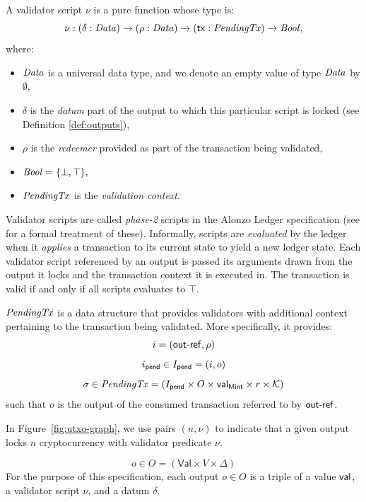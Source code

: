 \begin{definition}
A validator script $\nu$ is a pure function whose type is:
\[
  \nu : (\delta : \mathit{Data}) \to (\rho : \mathit{Data}) \to (\mathsf{tx} : \mathit{PendingTx})
  \to\mathit{Bool},
\]
where: 
\begin{itemize}
    \item $\mathit{Data}$ is a universal data type, and we denote an empty value of type $\mathit{Data}$ by $\emptyset$,  
    \item $\delta$ is the \emph{datum} part of the output to which this particular script is locked (see Definition \ref{def:outputs}),
    \item $\rho$ is the \emph{redeemer} provided as part of the transaction being validated,
    \item $\mathit{Bool} = \{\bot, \top\},$
    \item $\mathit{PendingTx}$ is the \emph{validation context}.
\end{itemize}
\end{definition}

Validator scripts are called \emph{phase-2} scripts in the Alonzo Ledger specification (see \cite{alozon-spec} for a formal treatment of these). Informally, scripts are \emph{evaluated} by the ledger when it \emph{applies} a transaction to its current state to yield a new ledger state. Each validator script referenced by an output is passed its arguments drawn from the output it locks and the transaction context it is executed in. The transaction is valid if and only if all scripts evaluates to $\top.$

\begin{definition}

$\mathit{PendingTx}$ is a data structure that provides validators with additional context pertaining to the transaction being validated. More specifically, it provides:
\[
  i = (\mathsf{out\textsf{-}{}ref}, \rho)
\]
\[
 i_{\mathsf{pend}} \in I_{\mathsf{pend}} = (i, o)
\]
\[
 \sigma \in \mathit{PendingTx} = (I_{\mathsf{pend}} \times O \times \mathsf{val}_\mathsf{Mint} \times r \times \mathcal K) 
\]
such that $o$ is the output of the
consumed transaction referred to by $\mathsf{out\textsf{-}{}ref}$.

In Figure~\ref{fig:utxo-graph}, we use pairs \((n, \nu)\) to indicate that a given output locks $n$ cryptocurrency with validator predicate $\nu$.
\end{definition}

\begin{definition}[Outputs]
$$
o \in O = (\mathsf{Val} \times V \times \Delta)
$$
For the purpose of this specification, each output \(o \in O\) is a triple of a value
$\mathsf{val}$, a validator script $\nu$, and a datum $\delta$.
\end{definition}


